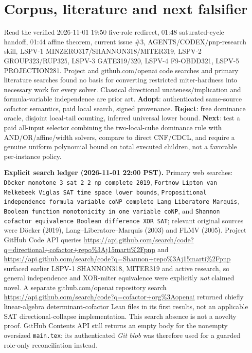 \documentclass[11pt]{article}
\begin{document}
\section{Corpus, literature and next falsifier}
Read the verified 2026-11-01 19:50 five-role redirect, 01:48 saturated-cycle handoff, 01:44 affine theorem, current issue \#3, AGENTS/CODEX/pnp-research skill, LSPV-1 MINZERO317/SHANNON318/MITER319, LSPV-2 GROUP323/RUP325, LSPV-3 GATE319/320, LSPV-4 F9-OBDD321, LSPV-5 PROJECTION281. Project and github.com/openai code searches and primary literature searches found no basis for converting restricted miter-hardness into necessary work for every solver. Classical directional unateness/implication and formula-variable independence are prior art. \textbf{Adopt}: authenticated same-source cofactor semantics, paid local search, signed provenance. \textbf{Reject}: free dominance oracle, disjoint local-tail counting, inferred universal lower bound. \textbf{Next}: test a paid all-input selector combining the two-local-cube dominance rule with AND/OR/affine/width solvers, compare to direct CNF/CDCL, and require a genuine uniform polynomial bound on total executed children, not a favorable per-instance policy.


\par\noindent\textbf{Explicit search ledger (2026-11-01 22:00 PST).}
Primary web searches: \texttt{D\"ocker monotone 3 sat 2 2 np complete 2019},
\texttt{Fortnow Lipton van Melkebeek Viglas SAT time space lower bounds},
\texttt{Propositional independence formula variable coNP complete Lang Liberatore Marquis},
\texttt{Boolean function monotonicity in one variable coNP}, and
\texttt{Shannon cofactor equivalence Boolean difference XOR SAT}; relevant original sources were D\"ocker (2019), Lang--Liberatore--Marquis (2003) and FLMV (2005).
Project GitHub Code API queries
\url{https://api.github.com/search/code?q=directional+cofactor+repo%3Aj15marti%2Fpnp} and
\url{https://api.github.com/search/code?q=Shannon+repo%3Aj15marti%2Fpnp}
surfaced earlier LSPV-1 SHANNON318, MITER319 and active research, so general independence and XOR-miter equivalence were explicitly \emph{not} claimed novel.
A separate github.com/openai repository search
\url{https://api.github.com/search/code?q=cofactor+org%3Aopenai}
returned chiefly linear-algebra determinant-cofactor Lean files in its first results, not an applicable SAT directional-collapse implementation. This search absence is not a novelty proof. GitHub Contents API still returns an empty body for the nonempty oversized \texttt{main.tex}; its authenticated \emph{Git blob} was therefore used for a guarded role-only reconciliation instead.
\end{document}
